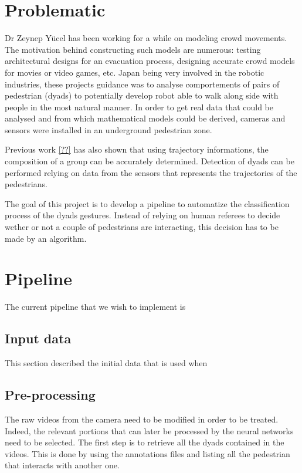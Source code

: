 \documentclass[12pt,a4paper,twoside]{article}
\begin{document}
\section{Problematic}

Dr Zeynep Yücel has been working for a while on modeling crowd movements. The motivation behind constructing such models are numerous: testing architectural designs for an evacuation process, designing accurate crowd models for movies or video games, etc. Japan being very involved in the robotic industries, these projects guidance was to analyse comportements of pairs of pedestrian (dyads) to potentially develop robot able to walk along side with people in the most natural manner. In order to get real data that could be analysed and from which mathematical models could be derived, cameras and sensors were installed in an underground pedestrian zone. 

Previous work \ref{??} has also shown that using trajectory informations, the composition of a group can be accurately determined. Detection of dyads can be performed relying on data from the sensors that represents the trajectories of the pedestrians.

The goal of this project is to develop a pipeline to automatize the classification process of the dyads gestures. Instead of relying on human referees to decide wether or not a couple of pedestrians are interacting, this decision has to be made by an algorithm.

\section{Pipeline}

The current pipeline that we wish to implement is 

\subsection{Input data}
This section described the initial data that is used when 

\subsection{Pre-processing}
The raw videos from the camera need to be modified in order to be treated. Indeed, the relevant portions that can later be processed by the neural networks need to be selected. The first step is to retrieve all the dyads contained in the videos. This is done by using the annotations files and listing all the pedestrian that interacts with another one.
\end{document}
